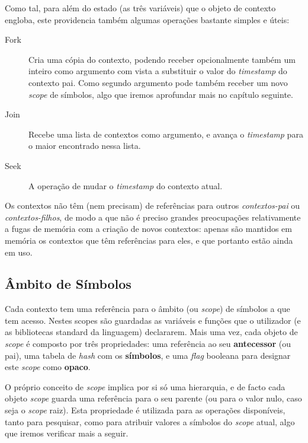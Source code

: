  Como tal, para além do estado (as três variáveis) que o objeto de contexto engloba, este providencia também algumas operações bastante simples e úteis:
 
 \begin{description}
  \item[Fork] Cria uma cópia do contexto, podendo receber opcionalmente também um inteiro como argumento com vista a substituir o valor do \textit{timestamp} do contexto pai. Como segundo argumento pode também receber um novo \textit{scope} de símbolos, algo que iremos aprofundar mais no capítulo seguinte.
  \item[Join] Recebe uma lista de contextos como argumento, e avança o \textit{timestamp} para o maior encontrado nessa lista.
  \item[Seek] A operação de mudar o \textit{timestamp} do contexto atual.
 \end{description}

 Os contextos não têm (nem precisam) de referências para outros \textit{contextos-pai} ou \textit{contextos-filhos}, de modo a que não é preciso grandes preocupações relativamente a fugas de memória com a criação de novos contextos: apenas são mantidos em memória os contextos que têm referências para eles, e que portanto estão ainda em uso.

\subsection{Âmbito de Símbolos}
Cada contexto tem uma referência para o âmbito (ou \textit{scope}) de símbolos a que tem acesso. Nestes scopes são guardadas as variáveis e funções que o utilizador (e as bibliotecas standard da linguagem) declararem. Mais uma vez, cada objeto de \textit{scope} é composto por três propriedades: uma referência ao seu \textbf{antecessor} (ou pai), uma tabela de \textit{hash} com os \textbf{símbolos}, e uma \textit{flag} booleana para designar este \textit{scope} como \textbf{opaco}.

O próprio conceito de \textit{scope} implica por si só uma hierarquia, e de facto cada objeto \textit{scope} guarda uma referência para o seu parente (ou para o valor nulo, caso seja o \textit{scope} raiz). Esta propriedade é utilizada para as operações disponíveis, tanto para pesquisar, como para atribuir valores a símbolos do \textit{scope} atual, algo que iremos verificar mais a seguir.

